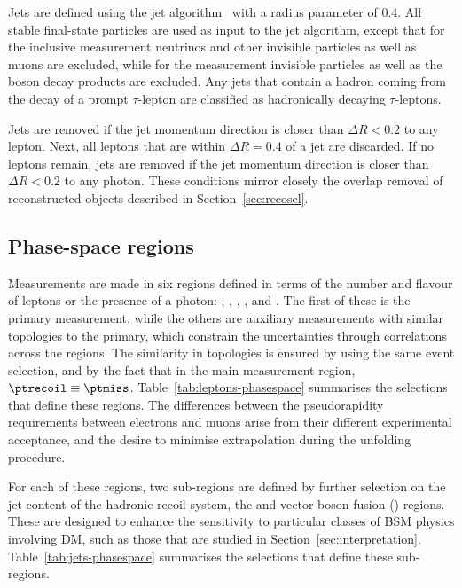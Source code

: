 \documentclass[atlasdraft=false, cernpreprint, UKenglish, texmf, orcidlogo]{atlasdoc}
\begin{document}
Jets are defined using the \antikt{} jet algorithm~\cite{Cacciari:2008gp,Cacciari:2011ma} with a radius parameter of 0.4.
All stable final-state particles are used as input to the jet
algorithm, except that for the inclusive \ptmiss measurement neutrinos and other invisible particles as well as muons
are excluded, while for the \Znunu measurement invisible particles as well as the boson decay products are excluded.
Any jets that contain a hadron coming from the decay of a prompt $\tau$-lepton are
classified as hadronically decaying $\tau$-leptons.
 
Jets are removed if the jet momentum direction is closer than \(\Delta R < 0.2\) to any lepton.
Next, all leptons that are within \(\Delta R = 0.4\) of a jet are discarded.
If no leptons remain, jets are removed if the jet momentum direction is closer than \(\Delta R < 0.2\) to any photon.
These conditions mirror closely the overlap removal of reconstructed objects described in Section~\ref{sec:recosel}.
 
\subsection{Phase-space regions}
\label{sec:particle-level-regions}
 
Measurements are made in six regions defined in terms of the number and
flavour of leptons or the presence of a photon: \ptmissjets, \oneeljets, \twoeljets{}, \onemujets, \twomujets and \onegjets.
The first of these is the primary measurement, while the others are auxiliary measurements with similar topologies to the primary,
which constrain the uncertainties through correlations across the regions.
The similarity in topologies is ensured by using the same event selection,
and by the fact that in the main \ptmiss measurement region, $\ptrecoil \equiv \ptmiss$.
Table~\ref{tab:leptons-phasespace} summarises the selections that define
these regions. The differences between the pseudorapidity requirements between electrons and muons arise from their different experimental acceptance, and the desire to minimise extrapolation during the unfolding procedure.
 
For each of these regions, two sub-regions are defined by further selection on the jet content of the hadronic
recoil system, the \onejet and vector boson fusion (\vbf{}) regions. These are designed to enhance the sensitivity
to particular classes of BSM physics involving DM, such as those that are studied in Section~\ref{sec:interpretation}.
Table~\ref{tab:jets-phasespace} summarises the selections that define these sub-regions.
 
\end{document}
